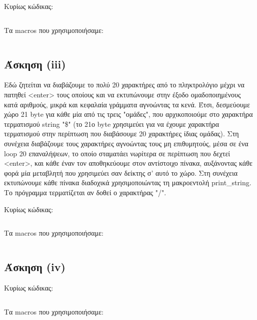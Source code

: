 \documentclass[a4paper,10pt]{article} \usepackage{anysize}
\begin{document}
\noindent Κυρίως κώδικας:
\inputminted[linenos,obeytabs,fontsize=\footnotesize]{nasm}{files/2.asm}
Τα macros που χρησιμοποιήσαμε:
\inputminted[linenos,obeytabs,fontsize=\footnotesize]{nasm}{files/2.txt}
\subsection*{Άσκηση (iii)}
Εδώ ζητείται να διαβάζουμε το πολύ 20 χαρακτήρες από το πληκτρολόγιο
μέχρι να πατηθεί <enter> τους οποίους και να εκτυπώνουμε
στην έξοδο ομαδοποιημένους κατά αριθμούς, μικρά και κεφαλαία γράμματα
αγνοώντας τα κενά. Έτσι, δεσμεύουμε χώρο 21 byte για κάθε μία από τις τρεις
"ομάδες", που αρχικοποιούμε στο χαρακτήρα τερματισμού string "\$" (το 21ο byte
χρησιμεύει για να έχουμε χαρακτήρα τερματισμού στην περίπτωση που διαβάσουμε
20 χαρακτήρες ίδιας ομάδας).  Στη συνέχεια διαβάζουμε τους χαρακτήρες
αγνοώντας τους μη επιθυμητούς, μέσα σε ένα loop 20 επαναλήψεων, 
το οποίο σταματάει νωρίτερα σε περίπτωση που δεχτεί <enter>, 
και κάθε έναν τον αποθηκεύουμε στον αντίστοιχο πίνακα,
αυξάνοντας κάθε φορά μία μεταβλητή που χρησιμεύει σαν δείκτης σ' αυτό το χώρο.
Στη συνέχεια εκτυπώνουμε κάθε πίνακα διαδοχικά χρησιμοποιώντας τη
μακροεντολή print\_string. Το πρόγραμμα τερματίζεται αν δοθεί ο χαρακτήρας "/".

\noindent Κυρίως κώδικας:
\inputminted[linenos,obeytabs,fontsize=\footnotesize]{nasm}{files/3.asm}
Τα macros που χρησιμοποιήσαμε:
\inputminted[linenos,obeytabs,fontsize=\footnotesize]{nasm}{files/3.txt}
\subsection*{Άσκηση (iv)}
Κυρίως κώδικας:
\inputminted[linenos,obeytabs,fontsize=\footnotesize]{nasm}{files/4.asm}
Τα macros που χρησιμοποιήσαμε:
\inputminted[linenos,obeytabs,fontsize=\footnotesize]{nasm}{files/4.txt}
\end{document}

